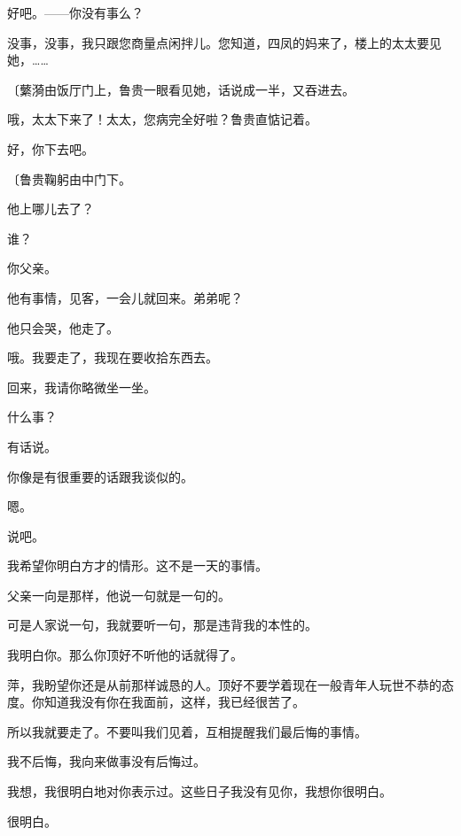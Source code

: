 好吧。——你没有事么？

没事，没事，我只跟您商量点闲拌儿。您知道，四凤的妈来了，楼上的太太要见她，……

{\fangsong〔蘩漪由饭厅门上，鲁贵一眼看见她，话说成一半，又吞进去。}

哦，太太下来了！太太，您病完全好啦？鲁贵直惦记着。

好，你下去吧。

{\fangsong〔鲁贵鞠躬由中门下。}

他上哪儿去了？

谁？

你父亲。

他有事情，见客，一会儿就回来。弟弟呢？

他只会哭，他走了。

哦。我要走了，我现在要收拾东西去。

回来，我请你略微坐一坐。

什么事？

有话说。

你像是有很重要的话跟我谈似的。

嗯。

说吧。

我希望你明白方才的情形。这不是一天的事情。

父亲一向是那样，他说一句就是一句的。

可是人家说一句，我就要听一句，那是违背我的本性的。

我明白你。那么你顶好不听他的话就得了。

萍，我盼望你还是从前那样诚恳的人。顶好不要学着现在一般青年人玩世不恭的态度。你知道我没有你在我面前，这样，我已经很苦了。

所以我就要走了。不要叫我们见着，互相提醒我们最后悔的事情。

我不后悔，我向来做事没有后悔过。

我想，我很明白地对你表示过。这些日子我没有见你，我想你很明白。

很明白。

